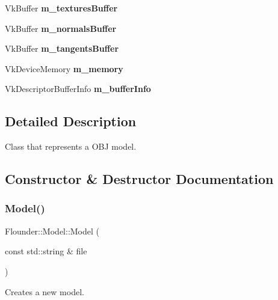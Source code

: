 \begin{DoxyCompactItemize}
Vk\+Buffer {\bfseries m\+\_\+textures\+Buffer}
\item 
\mbox{\label{class_flounder_1_1_model_ae1bb47dd47fe75703ab55459d80a8630}} 
Vk\+Buffer {\bfseries m\+\_\+normals\+Buffer}
\item 
\mbox{\label{class_flounder_1_1_model_a206957cff153001cd46d50e636049810}} 
Vk\+Buffer {\bfseries m\+\_\+tangents\+Buffer}
\item 
\mbox{\label{class_flounder_1_1_model_a1e3a9596bc32e0dd9838cc98ec27da71}} 
Vk\+Device\+Memory {\bfseries m\+\_\+memory}
\item 
\mbox{\label{class_flounder_1_1_model_a2175b6788299d913870122fbc47d72de}} 
Vk\+Descriptor\+Buffer\+Info {\bfseries m\+\_\+buffer\+Info}
\end{DoxyCompactItemize}


\subsection{Detailed Description}
Class that represents a O\+BJ model. 



\subsection{Constructor \& Destructor Documentation}
\mbox{\label{class_flounder_1_1_model_a85873f1078a62ced199618a15b714f84}} 
\subsubsection{\texorpdfstring{Model()}{Model()}\hspace{0.1cm}{\footnotesize\ttfamily [1/2]}}
{\footnotesize\ttfamily Flounder\+::\+Model\+::\+Model (\begin{DoxyParamCaption}\item[{const std\+::string \&}]{file }\end{DoxyParamCaption})}



Creates a new model. 



